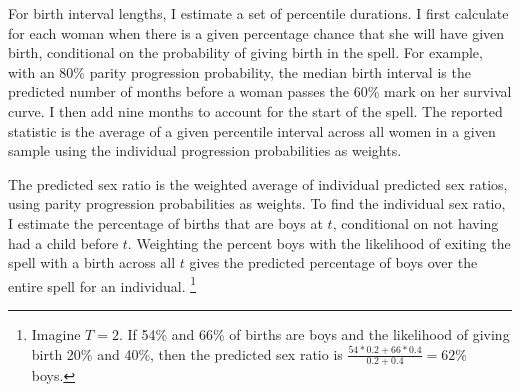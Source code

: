 \documentclass[12pt,letterpaper]{article}
\begin{document}
For birth interval lengths, I estimate a set of percentile durations. 
I first calculate for each woman when there is a given percentage chance that she will have 
given birth, conditional on the probability of giving birth in the spell. 
For example, with an 80\% parity progression probability, the median birth interval 
is the predicted number of months before a woman passes the 60\% mark on her survival 
curve. 
I then add nine months to account for the start of the spell. 
The reported statistic is the average of a given percentile interval across all women in 
a given sample using the individual progression probabilities as weights.



The predicted sex ratio is the weighted average of individual predicted sex ratios, using 
parity progression probabilities as weights.
To find the individual sex ratio, I estimate the percentage of births that are boys at $t$, 
conditional on not having had a child before $t$.
Weighting the percent boys with the likelihood of exiting the spell with a birth across all 
$t$ gives the predicted percentage of boys over the entire spell for an individual.%
\footnote{
Imagine $T=2$. 
If 54\% and 66\% of births are boys and the likelihood of giving birth 20\% and 40\%, 
then the predicted sex ratio is $\frac{54*0.2+66*0.4}{0.2+0.4} = 62$\% boys. 
}
\end{document}
